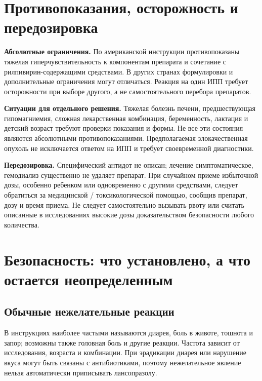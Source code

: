 \documentclass[11pt,a4paper,notitlepage]{report}
\newcommand{\src}[1]{\unskip\space\cite{#1}}
\begin{document}
\section{Противопоказания, осторожность и передозировка}

\textbf{Абсолютные ограничения.} По американской инструкции противопоказаны тяжелая гиперчувствительность к компонентам препарата и сочетание с рилпивирин-содержащими средствами. В других странах формулировки и дополнительные ограничения могут отличаться. Реакция на один ИПП требует осторожности при выборе другого, а не самостоятельного перебора препаратов.\src{uslabel}

\textbf{Ситуации для отдельного решения.} Тяжелая болезнь печени, предшествующая гипомагниемия, сложная лекарственная комбинация, беременность, лактация и детский возраст требуют проверки показания и формы. Не все эти состояния являются абсолютными противопоказаниями. Предполагаемая злокачественная опухоль не исключается ответом на ИПП и требует своевременной диагностики.\src{uslabel,emc}

\textbf{Передозировка.} Специфический антидот не описан; лечение симптоматическое, гемодиализ существенно не удаляет препарат. При случайном приеме избыточной дозы, особенно ребенком или одновременно с другими средствами, следует обратиться за медицинской / токсикологической помощью, сообщив препарат, дозу и время приема. Не следует самостоятельно вызывать рвоту или считать описанные в исследованиях высокие дозы доказательством безопасности любого количества.\src{emc,pharmalabel}

\section{Безопасность: что установлено, а что остается неопределенным}
\label{sec:safety}

\subsection{Обычные нежелательные реакции}
В инструкциях наиболее частыми называются диарея, боль в животе, тошнота и запор; возможны также головная боль и другие реакции. Частота зависит от исследования, возраста и комбинации. При эрадикации диарея или нарушение вкуса могут быть связаны с антибиотиками, поэтому нежелательное явление нельзя автоматически приписывать лансопразолу.\src{uslabel,emc}
\end{document}
